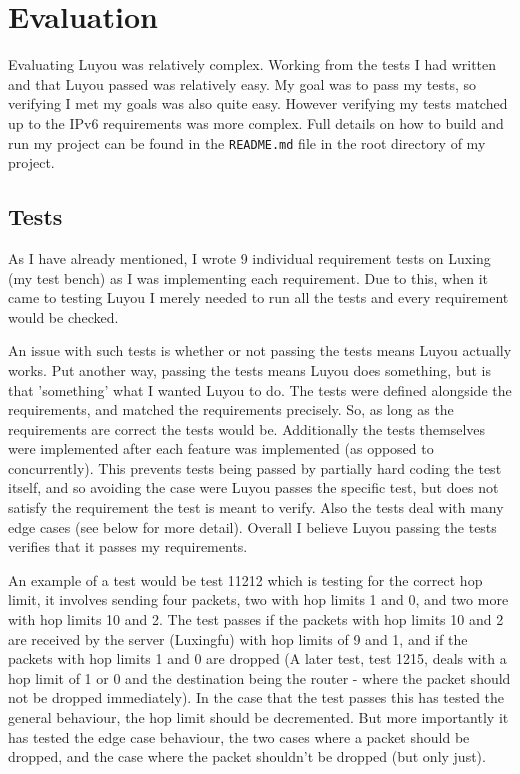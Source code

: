 \documentclass[12pt,a4paper,twoside,openany]{report}
\begin{document}
\chapter{Evaluation}

Evaluating Luyou was relatively complex. Working from the tests I had written and that Luyou passed was relatively easy.  My goal was to pass my tests, so verifying I met my goals was also quite easy.  However verifying my tests matched up to the IPv6 requirements was more complex. Full details on how to build and run my project can be found in the \verb!README.md! file in the root directory of my project. 

\section{Tests}

As I have already mentioned, I wrote 9 individual requirement tests on Luxing (my test bench) as I was implementing each requirement.  Due to this, when it came to testing Luyou I merely needed to run all the tests and every requirement would be checked.

\bigskip

An issue with such tests is whether or not passing the tests means Luyou actually works. Put another way, passing the tests means Luyou does something, but is that 'something' what I wanted Luyou to do.  The tests were defined alongside the requirements, and matched the requirements precisely.  So, as long as the requirements are correct the tests would be.  Additionally the tests themselves were implemented after each feature was implemented (as opposed to concurrently).  This prevents tests being passed by partially hard coding the test itself, and so avoiding the case were Luyou passes the specific test, but does not satisfy the requirement the test is meant to verify. Also the tests deal with many edge cases (see below for more detail). Overall I believe Luyou passing the tests verifies that it passes my requirements.

\bigskip

An example of a test would be test 11212 which is testing for the correct hop limit, it involves sending four packets, two with hop limits 1 and 0, and two more with hop limits 10 and 2.  The test passes if the packets with hop limits 10 and 2 are received by the server (Luxingfu) with hop limits of 9 and 1, and if the packets with hop limits 1 and 0 are dropped (A later test, test 1215, deals with a hop limit of 1 or 0 and the destination being the router - where the packet should not be dropped immediately).  In the case that the test passes this has tested the general behaviour, the hop limit should be decremented. But more importantly it has tested the edge case behaviour, the two cases where a packet should be dropped, and the case where the packet shouldn't be dropped (but only just).
\end{document}
